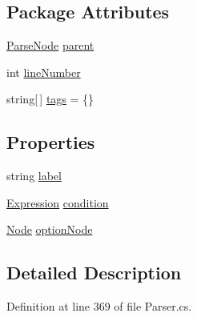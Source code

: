 \subsection*{Package Attributes}
\begin{DoxyCompactItemize}
\item 
\hyperlink{a00148}{Parse\-Node} \hyperlink{a00148_af313a82103fcc2ff5a177dbb06b92f7b}{parent}
\item 
int \hyperlink{a00148_a18b493382de0fde5b4299c1bd2250075}{line\-Number}
\item 
string\mbox{[}$\,$\mbox{]} \hyperlink{a00148_a58b3a15788fd2d4127d73619dc6d04ae}{tags} = \{\}
\end{DoxyCompactItemize}
\subsection*{Properties}
\begin{DoxyCompactItemize}
\item 
string \hyperlink{a00159_ab43ec731479a56891389f6ece87f5f62}{label}
\item 
\hyperlink{a00104}{Expression} \hyperlink{a00159_a31ece7f65af1e43961b68ba0275cdfaf}{condition}
\item 
\hyperlink{a00138}{Node} \hyperlink{a00159_a33d667370031f58b054b79a39891c3f3}{option\-Node}
\end{DoxyCompactItemize}


\subsection{Detailed Description}


Definition at line 369 of file Parser.\-cs.



